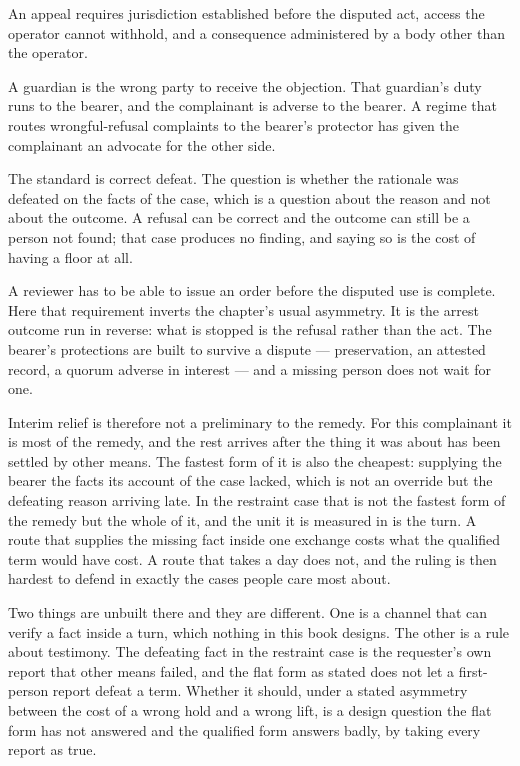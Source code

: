 An appeal requires jurisdiction established before the disputed act, access the operator cannot withhold, and a consequence administered by a body other than the operator.

A guardian is the wrong party to receive the objection. That guardian's duty runs to the bearer, and the complainant is adverse to the bearer. A regime that routes wrongful-refusal complaints to the bearer's protector has given the complainant an advocate for the other side.


The standard is correct defeat. The question is whether the rationale was defeated on the facts of the case, which is a question about the reason and not about the outcome. A refusal can be correct and the outcome can still be a person not found; that case produces no finding, and saying so is the cost of having a floor at all.


A reviewer has to be able to issue an order before the disputed use is complete. Here that requirement inverts the chapter's usual asymmetry. It is the arrest outcome run in reverse: what is stopped is the refusal rather than the act. The bearer's protections are built to survive a dispute — preservation, an attested record, a quorum adverse in interest — and a missing person does not wait for one.

Interim relief is therefore not a preliminary to the remedy. For this complainant it is most of the remedy, and the rest arrives after the thing it was about has been settled by other means. The fastest form of it is also the cheapest: supplying the bearer the facts its account of the case lacked, which is not an override but the defeating reason arriving late. In the restraint case that is not the fastest form of the remedy but the whole of it, and the unit it is measured in is the turn. A route that supplies the missing fact inside one exchange costs what the qualified term would have cost. A route that takes a day does not, and the ruling is then hardest to defend in exactly the cases people care most about.

Two things are unbuilt there and they are different. One is a channel that can verify a fact inside a turn, which nothing in this book designs. The other is a rule about testimony. The defeating fact in the restraint case is the requester's own report that other means failed, and the flat form as stated does not let a first-person report defeat a term. Whether it should, under a stated asymmetry between the cost of a wrong hold and a wrong lift, is a design question the flat form has not answered and the qualified form answers badly, by taking every report as true.

